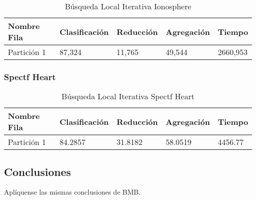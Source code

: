 \begin{table}[H]
    \centering
    \caption{Búsqueda Local Iterativa Ionosphere}
    \begin{tabular}{|l|l|l|l|l|}
    \hline
        Nombre Fila & Clasificación & Reducción & Agregación & Tiempo \\ \hline
        Partición 1  & 87,324 & 11,765 & 49,544 & 2660,953 \\ \hline
    \end{tabular}
    \label{ILS-Ionosphere}
\end{table}



\subsubsection{Spectf Heart}

\begin{table}[H]
    \centering
    \caption{Búsqueda Local Iterativa Spectf Heart}
    \begin{tabular}{|l|l|l|l|l|}
    \hline
        Nombre Fila & Clasificación & Reducción & Agregación & Tiempo \\ \hline
        Partición 1 & 84.2857  & 31.8182   &  58.0519  & 4456.77 
        \\ \hline
    \end{tabular}
    \label{ILS-Heart}
\end{table}

\subsection*{Conclusiones} 
Aplíquense las mismas conclusiones de BMB. 


